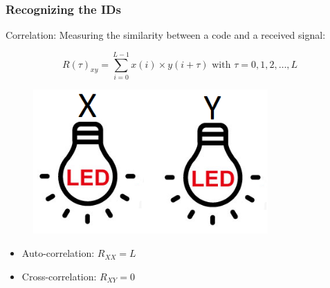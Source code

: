 \documentclass{beamer}
\begin{document}
	




	\begin{frame}\frametitle{Recognizing the IDs}
		
		Correlation: Measuring the similarity between a code and a received signal:

		\begin{equation*}
			R(\tau)_{xy} = \displaystyle\sum_{i = 0} ^ {L - 1} x(i) \times y(i + \tau) {\text{  with $\tau = 0, 1, 2, \dotsc, L$}}
		\end{equation*}

		

		\noindent
		\begin{minipage}{.5\linewidth}
			\begin{figure}
				\centering
				\includegraphics[width=0.8\textwidth]{correlation-leds.png}
			\end{figure}
		\end{minipage}%
		\begin{minipage}{.5\linewidth}
			\begin{itemize}
				\item Auto-correlation: $R_{XX} = L$
				\item Cross-correlation: $R_{XY} = 0$
			\end{itemize}
		\end{minipage}

%
%
%


	\end{frame}
\end{document}
